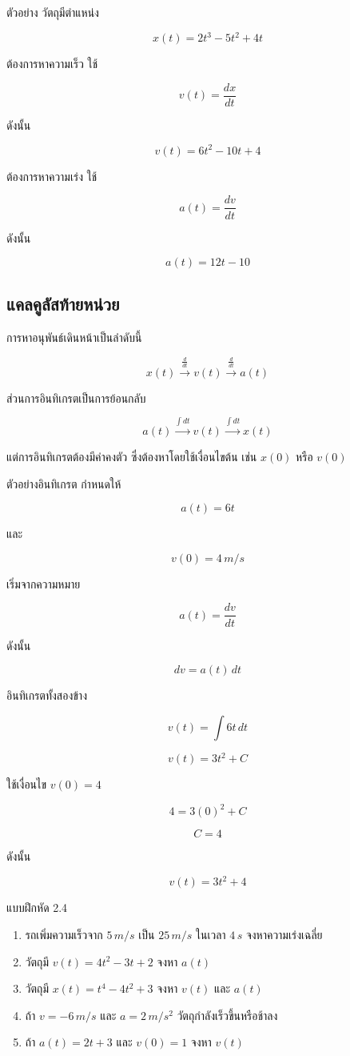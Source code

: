 \documentclass[12pt,a4paper]{report}
\begin{document}
\begin{examplebox}{ตัวอย่าง}
วัตถุมีตำแหน่ง

\[
x(t)=2t^3-5t^2+4t
\]

ต้องการหาความเร็ว ใช้

\[
v(t)=\frac{dx}{dt}
\]

ดังนั้น

\[
v(t)=6t^2-10t+4
\]

ต้องการหาความเร่ง ใช้

\[
a(t)=\frac{dv}{dt}
\]

ดังนั้น

\[
a(t)=12t-10
\]
\end{examplebox}

\subsection{แคลคูลัสท้ายหน่วย}

การหาอนุพันธ์เดินหน้าเป็นลำดับนี้

\[
x(t)\xrightarrow{\frac{d}{dt}}v(t)\xrightarrow{\frac{d}{dt}}a(t)
\]

ส่วนการอินทิเกรตเป็นการย้อนกลับ

\[
a(t)\xrightarrow{\int dt}v(t)\xrightarrow{\int dt}x(t)
\]

แต่การอินทิเกรตต้องมีค่าคงตัว ซึ่งต้องหาโดยใช้เงื่อนไขต้น เช่น $x(0)$ หรือ $v(0)$

\begin{examplebox}{ตัวอย่างอินทิเกรต}
กำหนดให้

\[
a(t)=6t
\]

และ

\[
v(0)=4\,\si{m/s}
\]

เริ่มจากความหมาย

\[
a(t)=\frac{dv}{dt}
\]

ดังนั้น

\[
dv=a(t)\,dt
\]

อินทิเกรตทั้งสองข้าง

\[
v(t)=\int 6t\,dt
\]

\[
v(t)=3t^2+C
\]

ใช้เงื่อนไข $v(0)=4$

\[
4=3(0)^2+C
\]

\[
C=4
\]

ดังนั้น

\[
v(t)=3t^2+4
\]
\end{examplebox}

\begin{exercisebox}{แบบฝึกหัด 2.4}
\begin{enumerate}
    \item รถเพิ่มความเร็วจาก $5\,\si{m/s}$ เป็น $25\,\si{m/s}$ ในเวลา $4\,\si{s}$ จงหาความเร่งเฉลี่ย
    \item วัตถุมี $v(t)=4t^2-3t+2$ จงหา $a(t)$
    \item วัตถุมี $x(t)=t^4-4t^2+3$ จงหา $v(t)$ และ $a(t)$
    \item ถ้า $v=-6\,\si{m/s}$ และ $a=2\,\si{m/s^2}$ วัตถุกำลังเร็วขึ้นหรือช้าลง
    \item ถ้า $a(t)=2t+3$ และ $v(0)=1$ จงหา $v(t)$
\end{enumerate}
\end{exercisebox}
\end{document}
